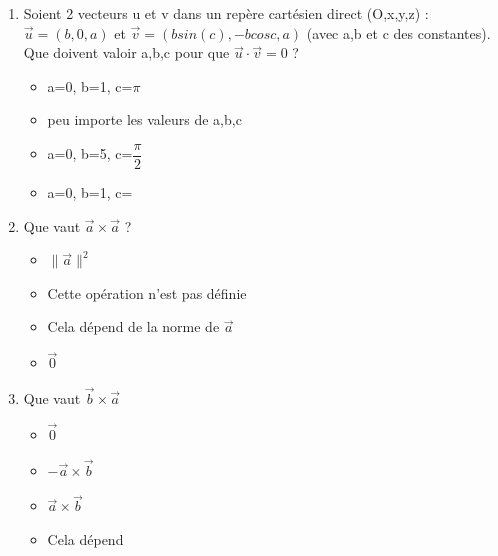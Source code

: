 \documentclass{article}
\begin{document}
\begin{enumerate}
    
    \item  Soient 2 vecteurs u et v dans un  repère cartésien direct (O,x,y,z) : $\Vec{u} = (b,0,a)$ et $\Vec{v} = (bsin(c),-bcosc,a)$ (avec a,b et c des constantes). Que doivent valoir a,b,c pour que $\Vec{u} \cdot \Vec{v} =0 $ ? 
    \begin{itemize}
        \item a=0, b=1, c=$\pi$  %
        \item peu importe les valeurs de a,b,c
        \item a=0, b=5, c=$\dfrac{\pi}{2}$
        \item a=0, b=1, c=
        
    \end{itemize}
    \item Que vaut $\Vec{a} \times \Vec{a}$ ?
    \begin{itemize}
        \item $ \lVert \Vec{a} \rVert ^2$
        \item Cette opération n'est pas définie
        \item Cela dépend de la norme de $\Vec{a}$
        \item $\Vec{0}$
    \end{itemize}
    
    \item Que vaut $\Vec{b} \times \Vec{a}$
    \begin{itemize}
        \item $\Vec{0}$
        \item $- \Vec{a} \times \Vec{b}$
        \item $\Vec{a} \times \Vec{b}$
        \item Cela dépend
    \end{itemize}
    

\end{enumerate}
\end{document}
